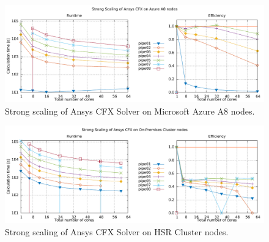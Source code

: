 \documentclass[3p,times]{elsarticle}
\begin{document}
\begin{figure}
\centering
	\centering
	\includegraphics[width=.7\linewidth]{gplt-a8-strong-pipe}	
	\caption{Strong scaling of Ansys CFX Solver on Microsoft Azure A8 nodes. }
	\label{fig:strongA8}
\end{figure}

\begin{figure}
	\centering
	\includegraphics[width=.7\linewidth]{gplt-hsr-strong-pipe}
	\caption{Strong scaling of Ansys CFX Solver on HSR Cluster nodes. }
	\label{fig:strongHSR}
\end{figure}
\end{document}
